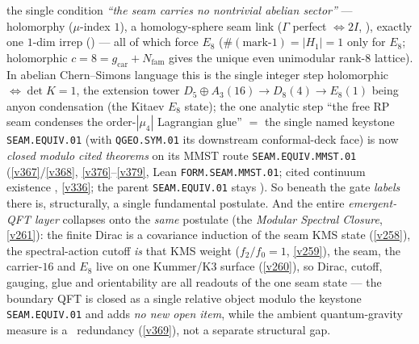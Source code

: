 \documentclass[11pt,a4paper]{article}
\newcommand{\gcar}{g_{\mathrm{car}}}
\newcommand{\Nfam}{N_{\mathrm{fam}}}
\begin{document}
the single condition \emph{``the seam carries no nontrivial abelian sector''} --- holomorphy ($\mu$-index
$1$), a homology-sphere seam link ($\Gamma$ perfect $\Leftrightarrow2I$, ),
exactly one $1$-dim irrep () --- all of which force $E_8$
($\#(\text{mark-}1)=|H_1|=1$ only for $E_8$; holomorphic $c=8=\gcar+\Nfam$ gives the unique even unimodular
rank-$8$ lattice). In abelian Chern--Simons language this is the single integer step holomorphic
$\Leftrightarrow\det K=1$, the extension tower $D_5{\oplus}A_3(16)\to D_8(4)\to E_8(1)$ being anyon
condensation (the Kitaev $E_8$ state); the one analytic step ``the free RP seam condenses the
order-$|\mu_4|$ Lagrangian glue'' $=$ the single named keystone \texttt{SEAM.EQUIV.01} (with
\texttt{QGEO.SYM.01} its downstream conformal-deck face) is now \emph{closed modulo cited theorems} on its MMST
route \texttt{SEAM.EQUIV.MMST.01}
(\vref{v367}/\vref{v368}, \vref{v376}--\vref{v379}, Lean \texttt{FORM.SEAM.MMST.01}; cited continuum existence \mO,
\vref{v336}; the parent \texttt{SEAM.EQUIV.01} stays \mO). So beneath the gate \emph{labels} there is,
structurally, a single fundamental postulate. And the entire \emph{emergent-QFT layer} collapses onto the
\emph{same} postulate (the \emph{Modular Spectral Closure}, \vref{v261}): the finite Dirac is a
covariance induction of the seam KMS state (\vref{v258}), the spectral-action cutoff \emph{is} that KMS
weight ($f_2/f_0=1$, \vref{v259}), the seam, the carrier-$16$ and $E_8$ live on one Kummer/K3 surface
(\vref{v260}), so Dirac, cutoff, gauging, glue and orientability are all readouts of the one seam state ---
the boundary QFT is closed as a single relative object modulo the keystone \texttt{SEAM.EQUIV.01} and adds
\emph{no new open item}, while the ambient quantum-gravity measure is a \mC\ redundancy (\vref{v369}), not a separate
structural gap.
 
\end{document}

